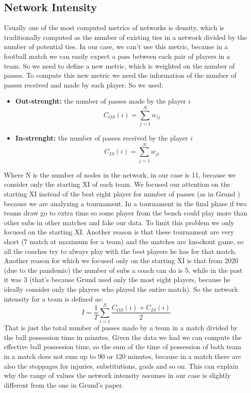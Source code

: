 \documentclass[12pt, a4paper]{article}
\begin{document}
\subsection{Network Intensity}
Usually one of the most computed metrics of networks is density, which
is traditionally computed as the number of existing ties in a network divided by the number of potential ties. In our case, we can't use this metric, because in a football match we can easily expect a pass between each pair of players in a team. So we need to define a new metric, which is weighted on the number of passes. To compute this new metric we need the information of the number of passes received and made by each player. So we used: 
\begin{itemize}
        \item \textbf{Out-strenght:} the number of passes made by the player $i$
        $$ C_{OS}(i) = \sum^{N}_{j=1}w_{ij}$$
        \item \textbf{In-strenght:} the number of passes received by the player $i$
         $$C_{IS}(i) = \sum^{N}_{j=1}w_{ji}$$
\end{itemize}
Where N is the number of nodes in the network, in our case is 11, because we consider only the starting XI of each team. We focused our attention on the starting XI instead of the best eight player for number of passes (as in Grund \cite{GRUND}) because we are analyzing a tournament. In a tournament in the final phase if two teams draw go to extra time so some player from the bench could play more than other subs in other matches and fake our data. To limit this problem we only focused on the starting XI. Another reason is that these tournament are very short (7 match at maximum for a team) and the matches are knockout game, so all the coaches try to always play with the best players he has for that match. Another reason for which we focused only on the starting XI is that from 2020 (due to the pandemic) the number of subs a coach can do is 5, while in the past it was 3 (that's because Grund used only the most eight players, because he ideally consider only the players who played the entire match). 
So the network intensity for a team is defined as:
$$I = \frac{1}{T}\sum^N_{i=1} \frac{ C_{OS}(i) +  C_{IS}(i)}{2}$$
That is just the total number of passes made by a team in a match divided by the ball possession time in minutes. Given the data we had we can compute the effective ball possession time, so the sum of the time of possession of both team in a match does not sum up to 90 or 120 minutes, because in a match there are also the stoppages for injuries, substitutions, goals and so on. This can explain why the range of values the network intensity assumes in our case is slightly different from the one in Grund's paper.
\\
\end{document}
